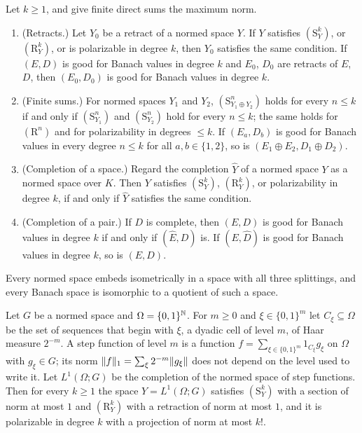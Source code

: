 \begin{proposition}[permanence]\label{cmb:prop:permanence}
Let $k\ge1$, and give finite direct sums the maximum norm.
\begin{enumerate}
\item \textup{(Retracts.)} Let $Y_0$ be a retract of a normed space $Y$. If $Y$ satisfies $(\mathrm S^k_Y)$, or
$(\mathrm R^k_Y)$, or is polarizable in degree $k$, then $Y_0$ satisfies the same condition. If $(E,D)$ is good for Banach
values in degree $k$ and $E_0$, $D_0$ are retracts of $E$, $D$, then $(E_0,D_0)$ is good for Banach values in degree $k$.
\item \textup{(Finite sums.)} For normed spaces $Y_1$ and $Y_2$, $(\mathrm S^n_{Y_1\oplus Y_2})$ holds for every $n\le k$ if
and only if $(\mathrm S^n_{Y_1})$ and $(\mathrm S^n_{Y_2})$ hold for every $n\le k$; the same holds for $(\mathrm R^n)$ and
for polarizability in degrees $\le k$. If $(E_a,D_b)$ is good for Banach values in every degree $n\le k$ for all
$a,b\in\{1,2\}$, so is $(E_1\oplus E_2,D_1\oplus D_2)$.
\item \textup{(Completion of a space.)} Regard the completion $\widehat Y$ of a normed space $Y$ as a normed space over
$K$. Then $Y$ satisfies $(\mathrm S^k_Y)$, $(\mathrm R^k_Y)$, or polarizability in degree $k$, if and only if $\widehat Y$
satisfies the same condition.
\item \textup{(Completion of a pair.)} If $D$ is complete, then $(E,D)$ is good for Banach values in degree $k$ if and only
if $(\widehat E,D)$ is. If $(E,\widehat D)$ is good for Banach values in degree $k$, so is $(E,D)$.
\end{enumerate}
\end{proposition}

Every normed space embeds isometrically in a space with all three splittings, and every Banach space is isomorphic to a
quotient of such a space.

\begin{theorem}\label{cmb:thm:cantor}
Let $G$ be a normed space and $\Omega=\{0,1\}^{\mathbb N}$. For $m\ge0$ and $\xi\in\{0,1\}^m$ let $C_\xi\subseteq\Omega$ be the
set of sequences that begin with $\xi$, a dyadic cell of level $m$, of Haar measure $2^{-m}$. A step function of level $m$
is a function $f=\sum_{\xi\in\{0,1\}^m}1_{C_\xi}g_\xi$ on $\Omega$ with $g_\xi\in G$; its norm
$\lVert f\rVert_1=\sum_\xi2^{-m}\lVert g_\xi\rVert$ does not depend on the level used to write it. Let $L^1(\Omega;G)$ be the
completion of the normed space of step functions. Then for every $k\ge1$ the space $Y=L^1(\Omega;G)$ satisfies
$(\mathrm S^k_Y)$ with a section of norm at most $1$ and $(\mathrm R^k_Y)$ with a retraction of norm at most $1$, and it is
polarizable in degree $k$ with a projection of norm at most $k!$.
\end{theorem}


